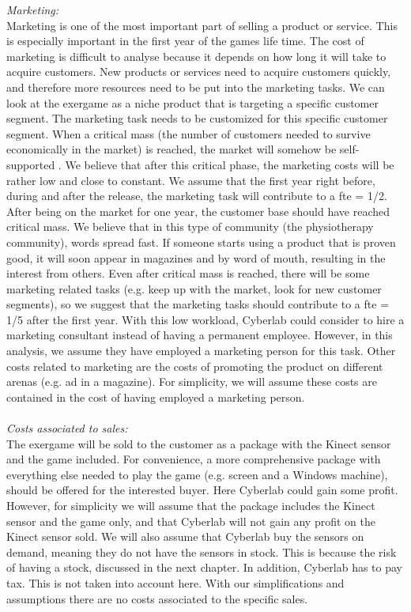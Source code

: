 \emph{Marketing:}\\
Marketing is one of the most important part of selling a product or service. This is especially important in the first year of the games life time. The cost of marketing is difficult to analyse because it depends on how long it will take to acquire customers. New products or services need to acquire customers quickly, and therefore more resources need to be put into the marketing tasks. We can look at the exergame as a niche product that is targeting a specific customer segment. The marketing task needs to be customized for this specific customer segment. When a critical mass (the number of customers needed to survive economically in the market) is reached, the market will somehow be self-supported \cite{informationrules}. We believe that after this critical phase, the marketing costs will be rather low and close to constant. We assume that the first year right before, during and after the release, the marketing task will contribute to a \ac{fte} = 1/2. After being on the market for one year, the customer base should have reached critical mass.  We believe that in this type of community (the physiotherapy community), words spread fast. If someone starts using a product that is proven good, it will soon appear in magazines and by word of mouth, resulting in the interest from others. Even after critical mass is reached, there will be some marketing related tasks (e.g. keep up with the market, look for new customer segments), so we suggest that the marketing tasks should contribute to a \ac{fte} = 1/5 after the first year. With this low workload, Cyberlab could consider to hire a marketing consultant instead of having a permanent employee. However, in this analysis, we assume they have employed a marketing person for this task. Other costs related to marketing are the costs of promoting the product on different arenas (e.g. ad in a magazine). For simplicity, we will assume these costs are contained in the cost of having employed a marketing person. \\ \\
\emph{Costs associated to sales:}\\
The exergame will be sold to the customer as a package with the Kinect sensor and the game included. For convenience, a more comprehensive package with everything else needed to play the game (e.g. screen and a Windows machine), should be offered for the interested buyer. Here Cyberlab could gain some profit. However, for simplicity we will assume that the package includes the Kinect sensor and the game only, and that Cyberlab will not gain any profit on the Kinect sensor sold. We will also assume that Cyberlab buy the sensors on demand, meaning they do not have the sensors in stock. This is because the risk of having a stock, discussed in the next chapter. In addition, Cyberlab has to pay tax. This is not taken into account here. With our simplifications and assumptions there are no costs associated to the specific sales. \\ \\
